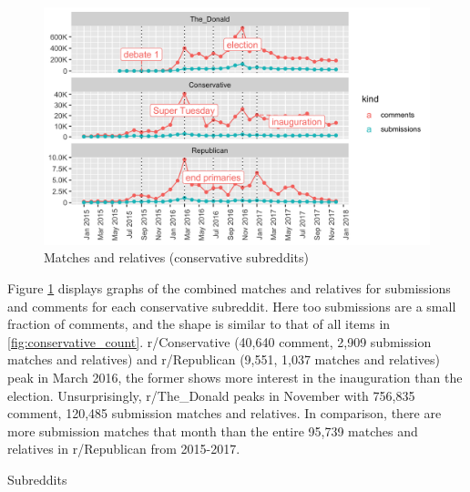 \documentclass[doublespacing]{utdthesis}
\begin{document}
\begin{figure}[!ht]
\centering
\includegraphics[width=\textwidth]{2016/conservative_match}
\caption{Matches and relatives (conservative subreddits)}
\label{fig:conservative_match}
\end{figure}

Figure \ref{fig:conservative_match} displays graphs of the combined matches and relatives for submissions and comments for each conservative subreddit.
Here too submissions are a small fraction of comments, and the shape is similar to that of all items in \ref{fig:conservative_count}.
r/Conservative (40,640 comment, 2,909 submission matches and relatives) and r/Republican (9,551, 1,037 matches and relatives) peak in March 2016, the former shows more interest in the inauguration than the election.
Unsurprisingly, r/The\_Donald peaks in November with 756,835 comment, 120,485 submission matches and relatives.
In comparison, there are more submission matches that month than the entire 95,739 matches and relatives in r/Republican from 2015-2017.

\begin{table}[!ht]
\centering
\caption{Subreddits}

\label{tab:subreddits}
\end{table}
\end{document}
